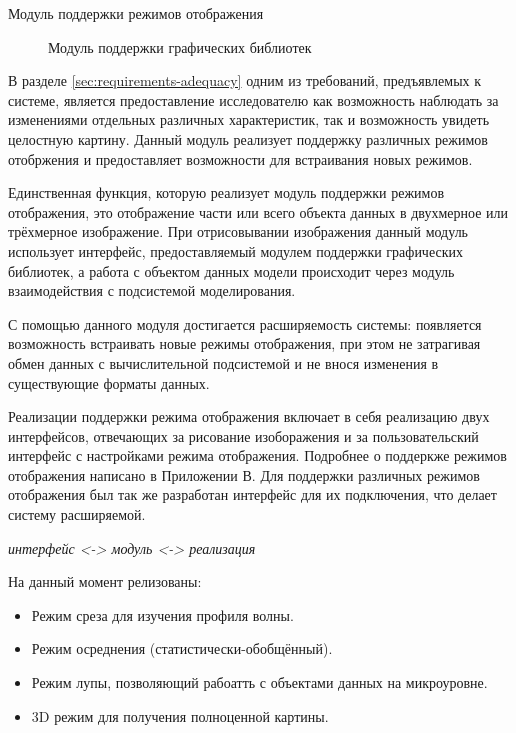 \documentclass[a4paper,12pt]{extarticle}
\begin{document}
\begin{subsection}{Модуль поддержки режимов отображения}
    \label{sec:architecture-render}
    \begin{figure}[h]
        \caption{Модуль поддержки графических библиотек}
        \label{ris:architecture-render}
    \end{figure}
    
    В разделе \ref{sec:requirements-adequacy} одним из требований, предъявлемых к системе, является предоставление исследователю как возможность наблюдать за изменениями отдельных различных характеристик, так и возможность увидеть целостную картину. Данный модуль реализует поддержку различных режимов отобржения и предоставляет возможности для встраивания новых режимов.

    Единственная функция, которую реализует модуль поддержки режимов отображения, это отображение части или всего объекта данных в двухмерное или трёхмерное изображение. При отрисовывании изображения данный модуль использует интерфейс, предоставляемый модулем поддержки графических библиотек, а работа с объектом данных модели происходит через модуль взаимодействия с подсистемой моделирования. 

    С помощью данного модуля достигается расширяемость системы: появляется возможность встраивать новые режимы отображения, при этом не затрагивая обмен данных с вычислительной подсистемой и не внося изменения в существующие форматы данных.

    Реализации поддержки режима отображения включает в себя реализацию двух интерфейсов, отвечающих за рисование изоборажения и за пользовательский интерфейс с настройками режима отображения. Подробнее о поддеркже режимов отображения написано в Приложении В.
    Для поддержки различных режимов отображения был так же разработан интерфейс для их подключения, что делает систему расширяемой. 
    
    \textit{интерфейс <-> модуль <-> реализация}
    
    На данный момент релизованы:
    \begin{itemize}
        \item Режим среза для изучения профиля волны.
        \item Режим осреднения (статистически-обобщённый).
        \item Режим лупы, позволяющий рабоатть с объектами данных на микроуровне.
        \item 3D режим для получения полноценной картины.
    \end{itemize}
\end{subsection}
\end{document}

